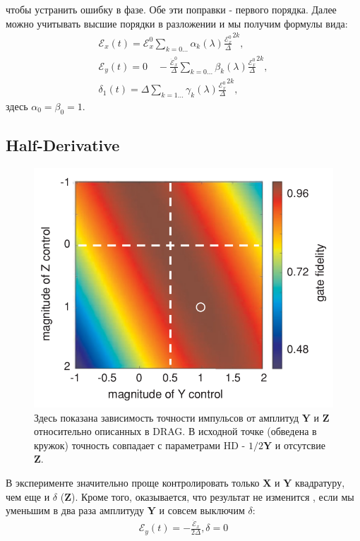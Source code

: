 \documentclass[12pt, twoside]{report}
\numberwithin{equation}{section}
\numberwithin{figure}{section}
\begin{document}
чтобы устранить ошибку в фазе. Обе эти поправки - первого порядка. Далее можно учитывать 
высшие порядки в разложении и мы получим формулы вида:
\begin{gather}
\mathcal{E}_x(t) = \mathcal{E}^0_x \sum_{k = 0...} \alpha_k\left(\lambda\right) \frac{\mathcal{E}^0_x}{\Delta}^{2k},  \\
\mathcal{E}_y(t) = 0 \quad -\frac{\dot{\mathcal{E}}^0_x}{\Delta} \sum_{k = 0...} \beta_k\left(\lambda\right) \frac{\mathcal{E}^0_x}{\Delta}^{2k}, \\
\delta_1(t) =  \Delta \sum_{k = 1...} \gamma_k\left(\lambda\right) \frac{\mathcal{E}^0_x}{\Delta}^{2k},
\label{eq:drag-inf}
\end{gather}
здесь $\alpha_0 =  \beta_0 = 1$. 
\pagebreak
\subsection{Half-Derivative} \label{subsec:HD}
\begin{figure}
\includegraphics[width = 0.5 \textwidth ]{Pictures2/YZ_control.png}
\caption{ Здесь показана зависимость точности импульсов от амплитуд $\mathbf{Y}$ и $\mathbf{Z}$ относительно описанных в DRAG. В исходной точке (обведена в кружок) точность совпадает с параметрами HD - $1/2 \mathbf{Y}$ и отсутсвие $\mathbf{Z}$.}
\label{fig:gaussian-tanh-envelope}
\end{figure}
В эксперименте значительно проще контролировать только $\mathbf{X}$ и $\mathbf{Y}$ квадратуру, чем еще и $\delta$ ($\mathbf{Z}$). Кроме того, оказывается, что результат не изменится \cite{Lucero2010}, если мы уменьшим в два раза амплитуду $\mathbf{Y}$ и совсем выключим $\delta$:
\begin{gather}
\mathcal{E}_y(t) = - \frac{\dot{\mathcal{E}}_x}{2\Delta},
\delta = 0
\label{eq:HD}
\end{gather}
\newline{}\newline{}\newline{}\newline{}\newline{}\newline{}\newline{}\newline{}\newline{}\newline{}\newline{}
\end{document}
